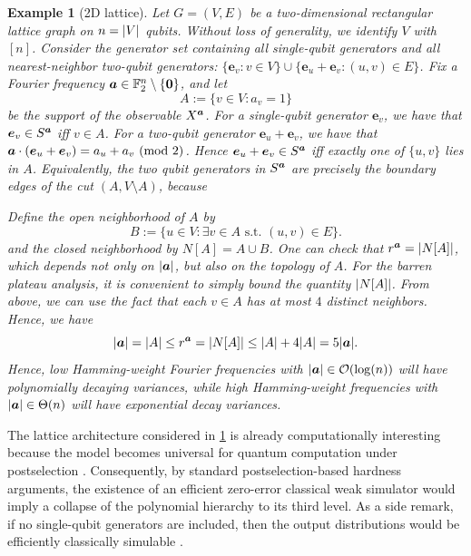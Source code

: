 \documentclass{article}
\theoremstyle{plain}
\newtheorem{example}[theorem]{Example}
\theoremstyle{definition}
\theoremstyle{remark}
\begin{document}
\begin{example}[2D lattice]
\label{eg:lattice}
Let $G=(V,E)$ be a two-dimensional rectangular lattice graph on $n=\abs{V}$ qubits. Without loss of generality, we identify $V$ with $[n]$. Consider the generator set containing all single-qubit generators and all nearest-neighbor two-qubit generators: $\{\bm{e}_v : v\in V\} \cup \{\bm{e}_u+\bm{e}_v : (u,v)\in E\}$. Fix a Fourier frequency ${\bm{a}} \in \mathbb{F}_2^n \setminus \{\bm{0}\}$, and let
\begin{equation*}
    A:=\{v\in V: a_v=1\}
\end{equation*}
be the support of the observable $X^{\bm{a}}$. For a single-qubit generator $\bm{e}_v$, we have that $\bm{e}_v\in S^{\bm{a}}$ iff $v\in A$. For a two-qubit generator $\bm{e}_u+\bm{e}_v$, we have that ${\bm{a}} \cdot (\bm{e}_u+\bm{e}_v)=a_u+a_v\ (\mathrm{mod}\ 2)$. Hence $\bm{e}_u+\bm{e}_v\in S^{\bm{a}}$ iff exactly one of $\{u,v\}$ lies in $A$. Equivalently, the two qubit generators in $S^{\bm{a}}$ are precisely the boundary edges of the cut $(A, V\setminus A)$, because 

Define the open neighborhood of $A$ by
\begin{equation}
B := \{u\in V: \exists v\in A  \text{ s.t. } (u,v)\in E\}.
\end{equation} and the closed neighborhood by $N[A] = A \cup B$. 
One can check that $r^{\bm{a}} = \abs{N[A]}$, which depends not only on $\abs{{\bm{a}}}$, but also on the topology of $A$. For the barren plateau analysis, it is convenient to simply bound the quantity $\abs{N[A]}$.
From above, we can use the fact that each $v\in A$ has at most $4$ distinct neighbors. Hence, we have
\begin{equation}
\abs{{\bm{a}}}=\abs{A} \leq  r^{\bm{a}}=\abs{N[A]} \leq \abs{A}+4\abs{A} = 5\abs{{\bm{a}}}.
\end{equation}
Hence, low Hamming-weight Fourier frequencies with $\abs{{\bm{a}}} \in \mathcal{O}(\log(n))$ will have polynomially decaying variances, while high Hamming-weight frequencies with $\abs{{\bm{a}}} \in \Theta(n)$ will have exponential decay variances.
\end{example}
The lattice architecture considered in \cref{eg:lattice} is already computationally interesting because the model becomes universal for quantum computation under postselection \cite{Fujii17}. Consequently, by standard postselection-based hardness arguments, the existence of an efficient zero-error classical weak simulator would imply a collapse of the polynomial hierarchy to its third level. As a side remark, if no single-qubit generators are included, then the output distributions would be efficiently classically simulable \cite{Fujii17}.
\end{document}

